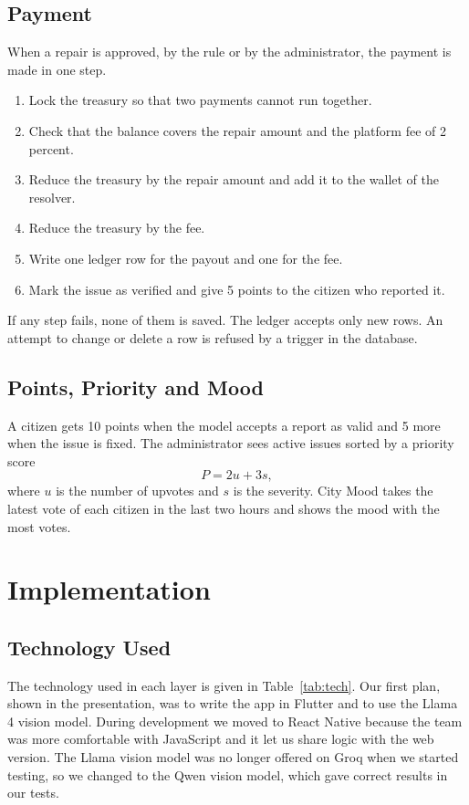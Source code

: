 \documentclass[conference,a4paper]{IEEEtran}
\begin{document}
\subsection{Payment}
When a repair is approved, by the rule or by the administrator, the payment is made in one step.
\begin{enumerate}
\item Lock the treasury so that two payments cannot run together.
\item Check that the balance covers the repair amount and the platform fee of 2 percent.
\item Reduce the treasury by the repair amount and add it to the wallet of the resolver.
\item Reduce the treasury by the fee.
\item Write one ledger row for the payout and one for the fee.
\item Mark the issue as verified and give 5 points to the citizen who reported it.
\end{enumerate}
If any step fails, none of them is saved. The ledger accepts only new rows. An attempt to change or delete a row is refused by a trigger in the database.

\subsection{Points, Priority and Mood}
A citizen gets 10 points when the model accepts a report as valid and 5 more when the issue is fixed. The administrator sees active issues sorted by a priority score
\begin{equation}
P = 2u + 3s,
\end{equation}
where $u$ is the number of upvotes and $s$ is the severity. City Mood takes the latest vote of each citizen in the last two hours and shows the mood with the most votes.

\section{Implementation}\label{sec:impl}
\subsection{Technology Used}
The technology used in each layer is given in Table~\ref{tab:tech}. Our first plan, shown in the presentation, was to write the app in Flutter and to use the Llama 4 vision model. During development we moved to React Native because the team was more comfortable with JavaScript and it let us share logic with the web version. The Llama vision model was no longer offered on Groq when we started testing, so we changed to the Qwen vision model, which gave correct results in our tests.
\end{document}
